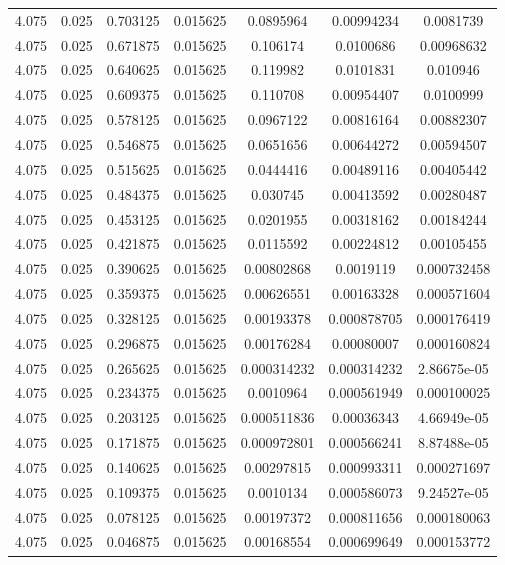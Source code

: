 \begin{flushleft}
\begin{longtable}{ccccccc}
4.075 & 0.025 & 0.703125 & 0.015625 & 0.0895964 & 0.00994234 & 0.0081739  \\ 
4.075 & 0.025 & 0.671875 & 0.015625 & 0.106174 & 0.0100686 & 0.00968632  \\ 
4.075 & 0.025 & 0.640625 & 0.015625 & 0.119982 & 0.0101831 & 0.010946  \\ 
4.075 & 0.025 & 0.609375 & 0.015625 & 0.110708 & 0.00954407 & 0.0100999  \\ 
4.075 & 0.025 & 0.578125 & 0.015625 & 0.0967122 & 0.00816164 & 0.00882307  \\ 
4.075 & 0.025 & 0.546875 & 0.015625 & 0.0651656 & 0.00644272 & 0.00594507  \\ 
4.075 & 0.025 & 0.515625 & 0.015625 & 0.0444416 & 0.00489116 & 0.00405442  \\ 
4.075 & 0.025 & 0.484375 & 0.015625 & 0.030745 & 0.00413592 & 0.00280487  \\ 
4.075 & 0.025 & 0.453125 & 0.015625 & 0.0201955 & 0.00318162 & 0.00184244  \\ 
4.075 & 0.025 & 0.421875 & 0.015625 & 0.0115592 & 0.00224812 & 0.00105455  \\ 
4.075 & 0.025 & 0.390625 & 0.015625 & 0.00802868 & 0.0019119 & 0.000732458  \\ 
4.075 & 0.025 & 0.359375 & 0.015625 & 0.00626551 & 0.00163328 & 0.000571604  \\ 
4.075 & 0.025 & 0.328125 & 0.015625 & 0.00193378 & 0.000878705 & 0.000176419  \\ 
4.075 & 0.025 & 0.296875 & 0.015625 & 0.00176284 & 0.00080007 & 0.000160824  \\ 
4.075 & 0.025 & 0.265625 & 0.015625 & 0.000314232 & 0.000314232 & 2.86675e-05  \\ 
4.075 & 0.025 & 0.234375 & 0.015625 & 0.0010964 & 0.000561949 & 0.000100025  \\ 
4.075 & 0.025 & 0.203125 & 0.015625 & 0.000511836 & 0.00036343 & 4.66949e-05  \\ 
4.075 & 0.025 & 0.171875 & 0.015625 & 0.000972801 & 0.000566241 & 8.87488e-05  \\ 
4.075 & 0.025 & 0.140625 & 0.015625 & 0.00297815 & 0.000993311 & 0.000271697  \\ 
4.075 & 0.025 & 0.109375 & 0.015625 & 0.0010134 & 0.000586073 & 9.24527e-05  \\ 
4.075 & 0.025 & 0.078125 & 0.015625 & 0.00197372 & 0.000811656 & 0.000180063  \\ 
4.075 & 0.025 & 0.046875 & 0.015625 & 0.00168554 & 0.000699649 & 0.000153772  \\ 

\end{longtable}
\end{flushleft}
